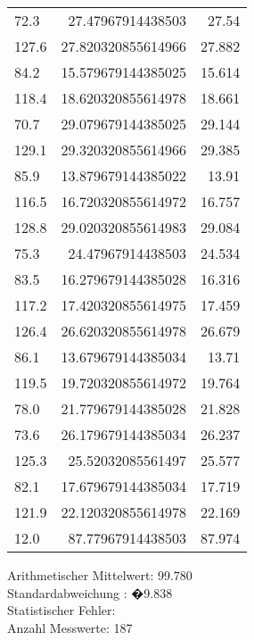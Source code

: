 \begin{table}[h!]
\begin{tabular}{l | r | r}
72.3 & 27.47967914438503 & 27.54 \\
127.6 & 27.820320855614966 & 27.882 \\
84.2 & 15.579679144385025 & 15.614 \\
118.4 & 18.620320855614978 & 18.661 \\
70.7 & 29.079679144385025 & 29.144 \\
129.1 & 29.320320855614966 & 29.385 \\
85.9 & 13.879679144385022 & 13.91 \\
116.5 & 16.720320855614972 & 16.757 \\
128.8 & 29.020320855614983 & 29.084 \\
75.3 & 24.47967914438503 & 24.534 \\
83.5 & 16.279679144385028 & 16.316 \\
117.2 & 17.420320855614975 & 17.459 \\
126.4 & 26.620320855614978 & 26.679 \\
86.1 & 13.679679144385034 & 13.71 \\
119.5 & 19.720320855614972 & 19.764 \\
78.0 & 21.779679144385028 & 21.828 \\
73.6 & 26.179679144385034 & 26.237 \\
125.3 & 25.52032085561497 & 25.577 \\
82.1 & 17.679679144385034 & 17.719 \\
121.9 & 22.120320855614978 & 22.169 \\
12.0 & 87.77967914438503 & 87.974 \\
 \hline
\end{tabular}
\end{table}

Arithmetischer Mittelwert: 99.780 \\
Standardabweichung \sigma : �9.838 \\
Statistischer Fehler:  \\
Anzahl Messwerte: 187 
